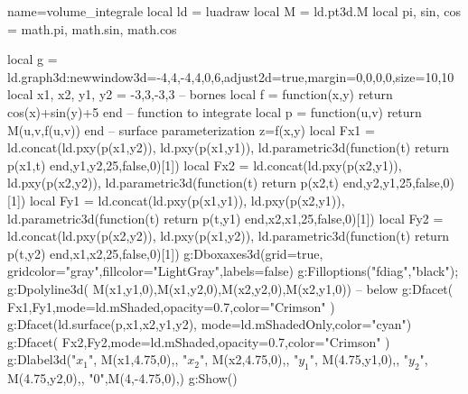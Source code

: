 \begin{luadraw}{name=volume_integrale}
local ld = luadraw
local M = ld.pt3d.M
local pi, sin, cos = math.pi, math.sin, math.cos

local g = ld.graph3d:new{window3d={-4,4,-4,4,0,6},adjust2d=true,margin={0,0,0,0},size={10,10}}
local x1, x2, y1, y2 = -3,3,-3,3 -- bornes
local f = function(x,y) return cos(x)+sin(y)+5 end -- function to integrate
local p = function(u,v) return M(u,v,f(u,v)) end -- surface parameterization z=f(x,y)
local Fx1 = ld.concat({ld.pxy(p(x1,y2)), ld.pxy(p(x1,y1))}, ld.parametric3d(function(t) return p(x1,t) end,y1,y2,25,false,0)[1])
local Fx2 = ld.concat({ld.pxy(p(x2,y1)), ld.pxy(p(x2,y2))}, ld.parametric3d(function(t) return p(x2,t) end,y2,y1,25,false,0)[1])
local Fy1 = ld.concat({ld.pxy(p(x1,y1)), ld.pxy(p(x2,y1))}, ld.parametric3d(function(t) return p(t,y1) end,x2,x1,25,false,0)[1])
local Fy2 = ld.concat({ld.pxy(p(x2,y2)), ld.pxy(p(x1,y2))}, ld.parametric3d(function(t) return p(t,y2) end,x1,x2,25,false,0)[1])
g:Dboxaxes3d({grid=true, gridcolor="gray",fillcolor="LightGray",labels=false})
g:Filloptions("fdiag","black"); g:Dpolyline3d( {M(x1,y1,0),M(x1,y2,0),M(x2,y2,0),M(x2,y1,0)}) -- below
g:Dfacet( {Fx1,Fy1},{mode=ld.mShaded,opacity=0.7,color="Crimson"} )
g:Dfacet(ld.surface(p,x1,x2,y1,y2), {mode=ld.mShadedOnly,color="cyan"})
g:Dfacet( {Fx2,Fy2},{mode=ld.mShaded,opacity=0.7,color="Crimson"} )
g:Dlabel3d("$x_1$", M(x1,4.75,0),{}, "$x_2$", M(x2,4.75,0),{},
"$y_1$", M(4.75,y1,0),{}, "$y_2$", M(4.75,y2,0),{}, "$0$",M(4,-4.75,0),{})
g:Show()
\end{luadraw}
